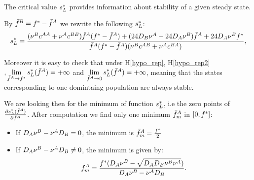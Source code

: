 The critical value ${s^{*}_{L}}$ provides information about stability of a given steady state. 

By ${\bar{f}^B}={f^{*}}-{\bar{f}^A}$ we rewrite the following ${s^{*}_{L}}$:
\begin{equation}
{s^{*}_{L}}=\frac{({\nu^B}{c^{AA}}+{\nu^A}{c^{BB}}){\bar{f}^A}({f^{*}}-{\bar{f}^A})+(24 D_B{\nu^A}-24 D_A{\nu^B}){\bar{f}^A}+24 D_A{\nu^B}{f^{*}}}{{\bar{f}^A}({f^{*}}-{\bar{f}^A})({\nu^B}{c^{AB}}+{\nu^A}{c^{BA}})},
\end{equation}

%

Moreover it is easy to check that under H\ref{hypo_rep}, H\ref{hypo_rep2}$, \displaystyle \lim_{{\bar{f}^A} \rightarrow f^{*}} {s^{*}_{L}}({\bar{f}^A})=+\infty $ and $ \displaystyle  \lim_{{\bar{f}^A} \rightarrow 0} {s^{*}_{L}}({\bar{f}^A})= +\infty$, meaning that the states corresponding to one domintaing population are always stable.

We are looking then for the minimum of function ${s^{*}_{L}}$, i.e the zero points of $\frac{{\partial} {s^{*}_{L}}({\bar{f}^A})}{{\partial} {\bar{f}^A}}$. After computation we find only one minimum ${{\bar{f}^A}_{m}}$ in $[0,{f^{*}}]$:
\begin{itemize}
 \item If $D_A {\nu^B} -{\nu^A} D_B=0$, the minimum is ${{\bar{f}^A}_{m}}=\frac{{f^{*}}}{2}$
 \item If $D_A {\nu^B} -{\nu^A} D_B\neq0$, the minimum is given by:
 \begin{equation}
{{\bar{f}^A}_{m}}=\frac{{f^{*}}(D_A {\nu^B} - \sqrt{D_A D_B {\nu^B} {\nu^A}})}{D_A {\nu^B} -{\nu^A} D_B}.
\end{equation}
\end{itemize}

